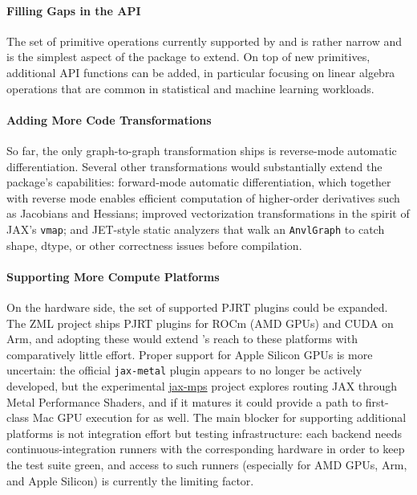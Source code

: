 \paragraph{Filling Gaps in the API}\label{filling-gaps-in-the-api}

The set of primitive operations currently supported by  and  is rather narrow and is the simplest aspect of the package to extend.
On top of new primitives, additional API functions can be added, in particular focusing on linear algebra operations that are common in statistical and machine learning workloads.

\paragraph{Adding More Code Transformations}\label{adding-more-code-transformations}

So far, the only graph-to-graph transformation  ships is reverse-mode automatic differentiation.
Several other transformations would substantially extend the package's capabilities: forward-mode automatic differentiation, which together with reverse mode enables efficient computation of higher-order derivatives such as Jacobians and Hessians; improved vectorization transformations in the spirit of JAX's \texttt{vmap}; and JET-style static analyzers that walk an \texttt{AnvlGraph} to catch shape, dtype, or other correctness issues before compilation.

\paragraph{Supporting More Compute Platforms}\label{supporting-more-compute-platforms}

On the hardware side, the set of supported PJRT plugins could be expanded.
The ZML project \citep{ref-zml} ships PJRT plugins for ROCm (AMD GPUs) and CUDA on Arm, and adopting these would extend 's reach to these platforms with comparatively little effort.
Proper support for Apple Silicon GPUs is more uncertain: the official \texttt{jax-metal} plugin appears to no longer be actively developed, but the experimental \href{https://github.com/tillahoffmann/jax-mps}{jax-mps} project explores routing JAX through Metal Performance Shaders, and if it matures it could provide a path to first-class Mac GPU execution for  as well.
The main blocker for supporting additional platforms is not integration effort but testing infrastructure: each backend needs continuous-integration runners with the corresponding hardware in order to keep the test suite green, and access to such runners (especially for AMD GPUs, Arm, and Apple Silicon) is currently the limiting factor.

